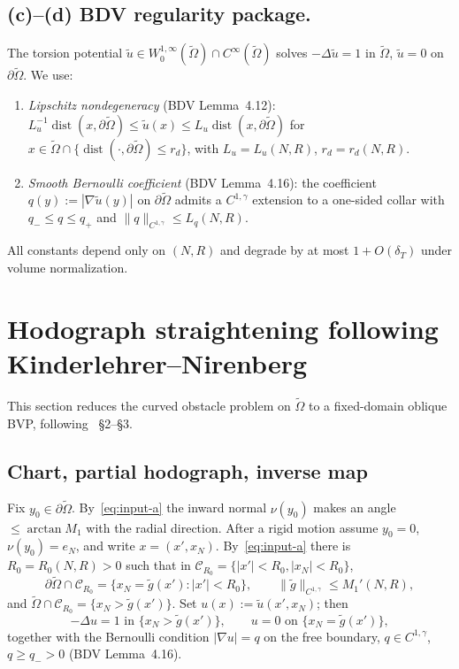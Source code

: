 \documentclass[11pt,a4paper]{article}
\theoremstyle{definition}
\theoremstyle{remark}
\newcommand{\Om}{\widetilde{\Omega}}
\newcommand{\norm}[1]{\lVert#1\rVert}
\newcommand{\dist}{\operatorname{dist}}
\newcommand{\bdry}{\partial}
\begin{document}
\subsection*{(c)--(d) BDV regularity package.}
The torsion potential $\widetilde u\in W^{1,\infty}_{0}(\Om)\cap C^{\infty}(\Om)$
solves $-\Delta\widetilde u=1$ in $\Om$, $\widetilde u=0$ on $\bdry\Om$. We
use:
\begin{enumerate}[label=\textup{(\roman*)},leftmargin=2.5em]
  \item \emph{Lipschitz nondegeneracy} (BDV Lemma~4.12):
        $L_{u}^{-1}\dist(x,\bdry\Om)\le\widetilde u(x)\le L_{u}\dist(x,\bdry\Om)$
        for $x\in\Om\cap\{\dist(\cdot,\bdry\Om)\le r_{d}\}$,
        with $L_{u}=L_{u}(N,R)$, $r_{d}=r_{d}(N,R)$.
  \item \emph{Smooth Bernoulli coefficient} (BDV Lemma~4.16): the
        coefficient $q(y):=|\nabla\widetilde u(y)|$ on $\bdry\Om$ admits a
        $C^{1,\gamma}$ extension to a one-sided collar with
        $q_{-}\le q\le q_{+}$ and $\norm{q}_{C^{1,\gamma}}\le L_{q}(N,R)$.
\end{enumerate}
All constants depend only on $(N,R)$ and degrade by at most $1+O(\delta_{T})$
under volume normalization.

\section{Hodograph straightening following Kinderlehrer--Nirenberg}\label{sec:hodo}

This section reduces the curved obstacle problem on $\Om$ to a
fixed-domain oblique BVP, following \cite{KN}~\S2--\S3.

\subsection{Chart, partial hodograph, inverse map}\label{ss:hodo-chart}

Fix $y_{0}\in\bdry\Om$. By~\eqref{eq:input-a} the inward normal $\nu(y_{0})$
makes an angle $\le\arctan M_{1}$ with the radial direction. After a
rigid motion assume $y_{0}=0$, $\nu(y_{0})=e_{N}$, and write $x=(x',x_{N})$.
By~\eqref{eq:input-a} there is $R_{0}=R_{0}(N,R)>0$ such that in
$\mathcal{C}_{R_{0}}=\{|x'|<R_{0},|x_{N}|<R_{0}\}$,
\[
   \bdry\Om\cap\mathcal{C}_{R_{0}}
      =\{x_{N}=\widetilde g(x'):|x'|<R_{0}\},
   \qquad \norm{\widetilde g}_{C^{1,\gamma}}\le M_{1}'(N,R),
\]
and $\Om\cap\mathcal{C}_{R_{0}}=\{x_{N}>\widetilde g(x')\}$. Set
$u(x):=\widetilde u(x',x_{N})$; then
\begin{equation}\label{eq:torsion-cyl}
   -\Delta u=1\text{ in }\{x_{N}>\widetilde g(x')\},\qquad
   u=0\text{ on }\{x_{N}=\widetilde g(x')\},
\end{equation}
together with the Bernoulli condition $|\nabla u|=q$ on the free boundary,
$q\in C^{1,\gamma}$, $q\ge q_{-}>0$ (BDV Lemma~4.16).
\end{document}
